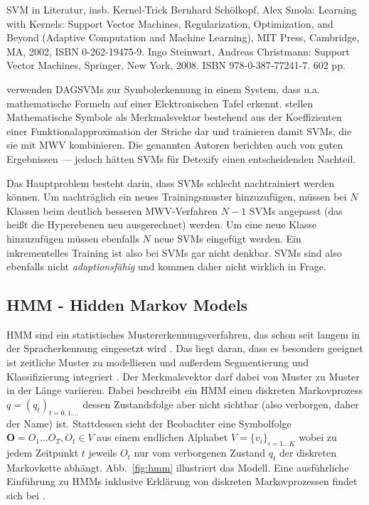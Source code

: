 \TODO SVM in Literatur, insb. Kernel-Trick Bernhard Schölkopf, Alex Smola: Learning with Kernels: Support Vector Machines, Regularization, Optimization, and Beyond (Adaptive Computation and Machine Learning), MIT Press, Cambridge, MA, 2002, ISBN 0-262-19475-9. Ingo Steinwart, Andreas Christmann: Support Vector Machines, Springer, New York, 2008. ISBN 978-0-387-77241-7. 602 pp.

\citet{Tapia:2003p11202,Tapia:2005p11236} verwenden \ac{DAGSVM}s \cite{Platt:2000p11488} zur Symbolerkennung in einem System, dass u.a. mathematische Formeln auf einer Elektronischen Tafel erkennt.
\citet{Golubitsky:2009p2456,Keshari:2008p528,Golubitsky:2009p2321} stellen Mathematische Symbole als Merkmalsvektor bestehend aus der Koeffizienten einer Funktionalapproximation der Striche dar und trainieren damit \ac{SVM}s, die sie mit \ac{MWV} kombinieren. Die genannten Autoren berichten auch von guten Ergebnissen — jedoch hätten \ac{SVM}s für Detexify einen entscheidenden Nachteil.

Das Hauptproblem besteht darin, dass SVMs schlecht nachtrainiert werden können. Um nachträglich ein neues Trainingsmuster hinzuzufügen, müssen bei $N$ Klassen beim deutlich besseren MWV-Verfahren \cite{Duan:2005p11426} $N-1$ SVMs angepasst (das heißt die Hyperebenen neu ausgerechnet) werden. Um eine neue Klasse hinzuzufügen müssen ebenfalls $N$ neue SVMs eingefügt werden. Ein inkrementelles Training ist also bei SVMs gar nicht denkbar. SVMs sind also ebenfalls nicht \emph{adaptionsfähig} und kommen daher nicht wirklich in Frage.

\subsection[HMM]{HMM - Hidden Markov Models} \label{sub:hmm}

\ac{HMM} sind ein statistisches Mustererkennungsverfahren, das schon seit langem in der Spracherkennung eingesetzt wird \cite{Rabiner:1989p11574}. Das liegt daran, dass es besonders geeignet ist zeitliche Muster zu modellieren und außerdem Segmentierung und Klassifizierung integriert \cite{Kosmala:1998p11691}. Der Merkmalsvektor darf dabei von Muster zu Muster in der Länge variieren.
Dabei beschreibt ein HMM einen diskreten Markovprozess $q=(q_t)_{t=0,1.\dots}$ dessen Zustandsfolge aber nicht sichtbar (also verborgen, daher der Name) ist. Stattdessen sieht der Beobachter eine Symbolfolge $\mathbf{O}=O_1\dots O_T, O_t\in V$ aus einem endlichen Alphabet $V=\{v_i\}_{i=1\dots K}$ wobei zu jedem Zeitpunkt $t$ jeweils $O_t$ nur vom verborgenen Zustand $q_t$ der diskreten Markovkette abhängt. Abb.~\ref{fig:hmm} illustriert das Modell. Eine ausführliche Einführung zu HMMs inklusive Erklärung von diskreten Markovprozessen findet sich bei \citet{Rabiner:1989p11574}. 

